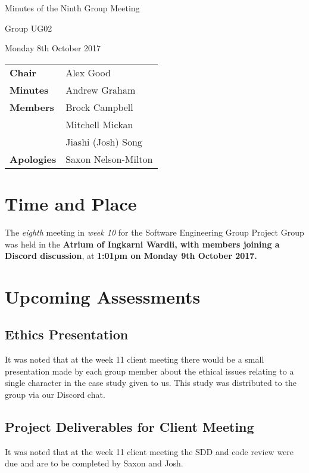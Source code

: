 \documentclass{article}
\begin{document}
\begin{center}    
{\huge Minutes of the Ninth Group Meeting \par}
\vspace{0.5cm}
{\large Group UG02 \par}
\vspace{0.5cm}
{\large Monday 8th October 2017 \par}
\vspace{0.5cm}
\end{center}

\begin{flushleft}
\begin{tabular}{ll}
{\bfseries Chair} & Alex Good \\
{\bfseries Minutes} & Andrew Graham \\
{\bfseries Members}
 & Brock Campbell \\
 & Mitchell Mickan \\
 & Jiashi (Josh) Song \\
{\bfseries Apologies}  & Saxon Nelson-Milton\\
\end{tabular}
\end{flushleft}

\section{Time and Place}
The {\itshape eighth} meeting in {\itshape week 10} for the Software Engineering Group Project Group was held in the {\bfseries Atrium of Ingkarni Wardli, with members joining a Discord discussion}, at {\bfseries 1:01pm on Monday 9th October 2017.} 

\section{Upcoming Assessments}
	\subsection{Ethics Presentation}
    It was noted that at the week 11 client meeting there would be a small presentation made by each group member about the ethical issues relating to a single character in the case study given to us. This study was distributed to the group via our Discord chat. 
    \subsection{Project Deliverables for Client Meeting}
It was noted that at the week 11 client meeting the SDD and code review were due and are to be completed by Saxon and Josh.
\end{document}
